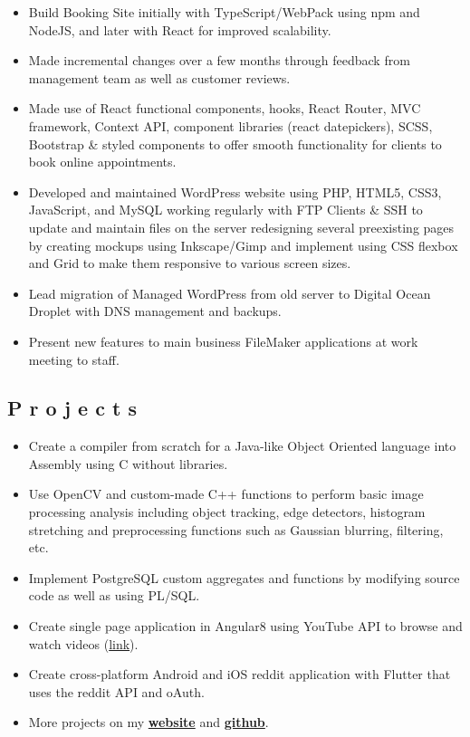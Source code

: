 \documentclass{resume}
\begin{document}
\begin{itemize}
\item \small \raggedright Build Booking Site initially with TypeScript/WebPack using npm and NodeJS, and later with React for improved scalability.
\item \small \raggedright Made incremental changes over a few months through feedback from management team as well as customer reviews.
\item \small \raggedright Made use of React functional components, hooks, React Router, MVC framework, Context API, component libraries (react datepickers), SCSS, Bootstrap \& styled components to offer smooth functionality for clients to book online appointments.
\item \small \raggedright Developed and maintained WordPress website using PHP, HTML5, CSS3, JavaScript, and MySQL working regularly with FTP Clients \& SSH to update and maintain files on the server redesigning several preexisting pages by creating mockups using Inkscape/Gimp and implement using CSS flexbox and Grid to make them responsive to various screen sizes.
\item \small \raggedright Lead migration of Managed WordPress from old server to Digital Ocean Droplet with DNS management and backups.
\item \small \raggedright Present new features to main business FileMaker applications at work meeting to staff.
\end{itemize}


\subsection{P r o j e c t s}
\begin{itemize}
\item \small Create a compiler from scratch for a Java-like Object Oriented language into Assembly using C without libraries.
\item \small Use OpenCV and custom-made C++ functions to perform basic image processing analysis including object tracking, edge detectors, histogram stretching and preprocessing functions such as Gaussian blurring, filtering, etc.
\item \small Implement PostgreSQL custom aggregates and functions by modifying source code as well as using PL/SQL.
\item \small Create single page application in Angular8 using YouTube API to browse and watch videos (\href{https://github.com/mushfiq814/youtube-data-api-dogVids}{link}).
\item \small Create cross-platform Android and iOS reddit application with Flutter that uses the reddit API and oAuth.
\item \small More projects on my \href{https://mushfiqmahmud.com/html/projects}{\textbf{website}} and \href{https://github.com/mushfiq814}{\textbf{github}}.
\end{itemize}

\end{document}
